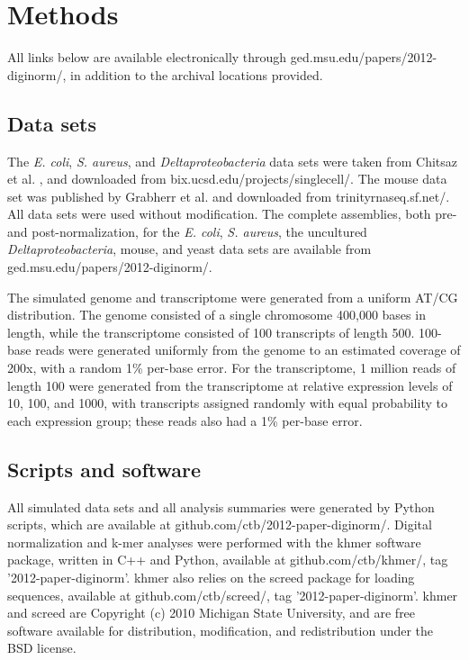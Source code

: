 \documentclass[10pt]{article}
\begin{document}

\section*{Methods}

All links below are available electronically through
ged.msu.edu/papers/2012-diginorm/, in addition to the
archival locations provided.

\subsection*{Data sets}

The {\em E. coli}, {\em S. aureus}, and {\em Deltaproteobacteria} data
sets were taken from Chitsaz et al. \cite{pubmed21926975}, and
downloaded from bix.ucsd.edu/projects/singlecell/.  The
mouse data set was published by Grabherr et al. \cite{pubmed21572440}
and downloaded from trinityrnaseq.sf.net/.  All data sets
were used without modification.
The complete assemblies, both pre- and post-normalization, for the
{\em E. coli}, {\em S. aureus}, the uncultured {\em
  Deltaproteobacteria}, mouse, and yeast data sets are available from
ged.msu.edu/papers/2012-diginorm/.

The simulated genome and transcriptome were generated from a uniform
AT/CG distribution.  The genome consisted of a single chromosome
400,000 bases in length, while the transcriptome consisted of 100
transcripts of length 500.  100-base reads were generated uniformly
from the genome to an estimated coverage of 200x, with a random 1\%
per-base error.  For the transcriptome, 1 million reads of length 100
were generated from the transcriptome at relative expression levels of
10, 100, and 1000, with transcripts assigned randomly with equal
probability to each expression group; these reads also had a 1\%
per-base error.

\subsection*{Scripts and software}

All simulated data sets and all analysis summaries were generated by
Python scripts, which are available at
github.com/ctb/2012-paper-diginorm/.  Digital normalization and k-mer
analyses were performed with the khmer software package, written in
C++ and Python, available at github.com/ctb/khmer/, tag
'2012-paper-diginorm'.  khmer also relies on the screed package for
loading sequences, available at github.com/ctb/screed/, tag
'2012-paper-diginorm'.  khmer and screed are Copyright (c) 2010
Michigan State University, and are free software available for
distribution, modification, and redistribution under the BSD license.
\end{document}
